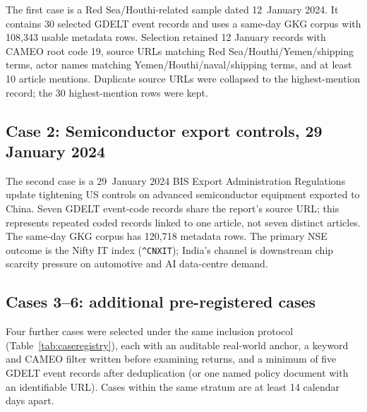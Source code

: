 \documentclass[10pt,a4paper,twocolumn]{article}
\begin{document}
The first case is a Red Sea/Houthi-related sample dated 12~January 2024. It contains 30 selected GDELT event records and uses a same-day GKG corpus with 108{,}343 usable metadata rows. Selection retained 12 January records with CAMEO root code 19, source URLs matching Red Sea/Houthi/Yemen/shipping terms, actor names matching Yemen/Houthi/naval/shipping terms, and at least 10 article mentions. Duplicate source URLs were collapsed to the highest-mention record; the 30 highest-mention rows were kept.

\subsection{Case 2: Semiconductor export controls, 29 January 2024}

The second case is a 29~January 2024 BIS Export Administration Regulations update tightening US controls on advanced semiconductor equipment exported to China. Seven GDELT event-code records share the report's source URL; this represents repeated coded records linked to one article, not seven distinct articles. The same-day GKG corpus has 120{,}718 metadata rows. The primary NSE outcome is the Nifty IT index (\texttt{\^{}CNXIT}); India's channel is downstream chip scarcity pressure on automotive and AI data-centre demand.

\subsection{Cases 3--6: additional pre-registered cases}\label{sec:newcases}

Four further cases were selected under the same inclusion protocol (Table~\ref{tab:caseregistry}), each with an auditable real-world anchor, a keyword and CAMEO filter written before examining returns, and a minimum of five GDELT event records after deduplication (or one named policy document with an identifiable URL). Cases within the same stratum are at least 14 calendar days apart.
\end{document}
